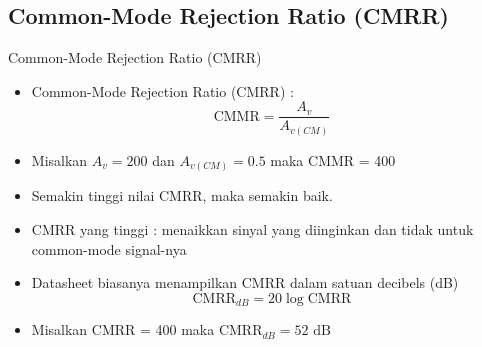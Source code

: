 \documentclass[aspectratio=169]{beamer}
\begin{document}
\subsection{Common-Mode Rejection Ratio (CMRR)}
\begin{frame}{Common-Mode Rejection Ratio (CMRR)}
	\begin{itemize}
		\item Common-Mode Rejection Ratio (CMRR) :
		\begin{equation}\label{pers.21}
			\text{CMMR} = \frac{A_v}{A_{v(CM)}}
		\end{equation}
		\item Misalkan $ A_v = 200 $ dan $ A_{v(CM)} = 0.5 $ maka CMMR = 400
		\item Semakin tinggi nilai CMRR, maka semakin baik.
		\item CMRR yang tinggi : menaikkan sinyal yang diinginkan dan tidak untuk common-mode signal-nya
		\item Datasheet biasanya menampilkan CMRR dalam satuan decibels (dB)
		\begin{equation}\label{pers.22}
			\text{CMRR}_{dB} = 20 \log \text{CMRR}
		\end{equation}
		\item Misalkan CMRR = 400 maka $ \text{CMRR}_{dB} = 52 \text{ dB} $
	\end{itemize}
\end{frame}
\end{document}
